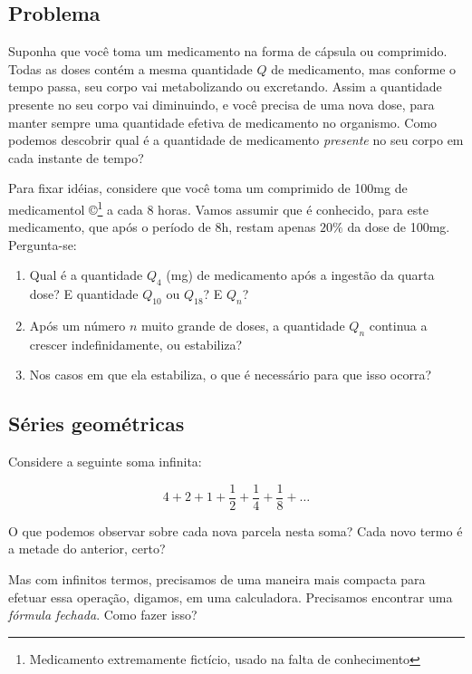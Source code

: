 \documentclass[a4paper]{article}
\begin{document}
\subsection{Problema}

Suponha que você toma um medicamento na forma de cápsula ou
comprimido. Todas as doses contém a mesma quantidade $Q$ de
medicamento, mas conforme o tempo passa, seu corpo vai metabolizando
ou excretando. Assim a quantidade presente no seu corpo vai
diminuindo, e você precisa de uma nova dose, para manter sempre uma
quantidade efetiva de medicamento no organismo. Como podemos descobrir
qual é a quantidade de medicamento {\em presente} no seu corpo em cada
instante de tempo?

Para fixar idéias, considere que você toma um comprimido de 100mg de
medicamentol \copyright\footnote{Medicamento extremamente fictício,
  usado na falta de conhecimento} a cada 8 horas. Vamos assumir que é
conhecido, para este medicamento, que após o período de 8h, restam
apenas $20\%$ da dose de 100mg. Pergunta-se:

\begin{enumerate}
\item Qual é a quantidade $Q_4$ (mg) de medicamento após a ingestão da
  quarta dose? E quantidade $Q_{10}$ ou $Q_{18}$? E $Q_n$?
\item Após um número $n$ muito grande de doses, a quantidade $Q_n$
  continua a crescer indefinidamente, ou estabiliza?
\item Nos casos em que ela estabiliza, o que é necessário para que
  isso ocorra?
\end{enumerate}

\subsection{Séries geométricas}

Considere a seguinte soma infinita:

\begin{displaymath}
  4+ 2+ 1+ \frac{1}{2} +\frac{1}{4} + \frac{1}{8} + \ldots
\end{displaymath}

O que podemos observar sobre cada nova parcela nesta soma? Cada novo
termo é a metade do anterior, certo?

Mas com infinitos termos, precisamos de uma maneira mais compacta para
efetuar essa operação, digamos, em uma calculadora. Precisamos
encontrar uma {\em fórmula fechada}. Como fazer isso?
\end{document}
